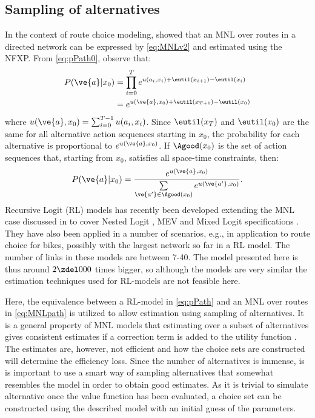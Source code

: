 \subsection{Sampling of alternatives}
In the context of route choice modeling, \citet{fosgerau2013} showed that an MNL over routes in a directed network can be expressed by \eqref{eq:MNLv2} and estimated using the NFXP. From \eqref{eq:pPath0}, observe that: 
\begin{equation}\label{eq:pPath}
\begin{aligned}
P(\ve{a}|x_0) & = \prod_{i=0}^{T} e^{u(a_i,x_i) + \eutil(x_{i+1})-\eutil(x_i)} \\
& = e^{u(\ve{a},x_0) + \eutil(x_{T+1})-\eutil(x_0)}
\end{aligned}
\end{equation}
where $u(\ve{a},x_0) = \sum_{i=0}^{T-1} u(a_i,x_i)$. Since $\eutil(x_{T})$ and $\eutil(x_0)$ are the same for all alternative action sequences starting in $x_0$, the probability for each alternative is proportional to $e^{u(\ve{a},x_0) }$. If $\Agood(x_0)$ is the set of action sequences that, starting from $x_0$, satisfies all space-time constraints, then:
\begin{equation} \label{eq:MNLpath}
P(\ve{a}|x_0) = \frac{e^{u(\ve{a},x_0)}}{\sum\limits_{\ve{a'} \in \Agood(x_0)}e^{u(\ve{a'},x_0)}}.
\end{equation}
Recursive Logit (RL) models has recently been developed extending the MNL case discussed in \citet{fosgerau2013} to cover Nested Logit \citep{mai2015}, MEV \citep{mai2016method} and Mixed Logit specifications \citep{mai2016decomposition}. They have also been applied in a number of scenarios, e.g., in \cite{zimmermann2017bike}  application to route choice for bikes, possibly with the largest network so far in a RL model. The number of links in these models are between 7-40. The model presented here is thus around $2\zdel 000$ times bigger, so although the models are very similar the estimation techniques used for RL-models are not feasible here. 

Here, the equivalence between a RL-model in \eqref{eq:pPath} and an MNL over routes in \eqref{eq:MNLpath} is utilized to allow estimation using sampling of alternatives. 
It is a general property of MNL models that estimating over a subset of alternatives gives consistent estimates if a correction term is added to the utility function \citep{mcfadden78}. The estimates are, however, not efficient and how the choice sets are constructed will determine the efficiency loss. Since the number of alternatives is immense, is is important to use a smart way of sampling alternatives that somewhat resembles the model in order to obtain good estimates. As it is trivial to simulate alternative once the value function has been evaluated, a choice set can be constructed using the described model with an initial guess of the parameters.

